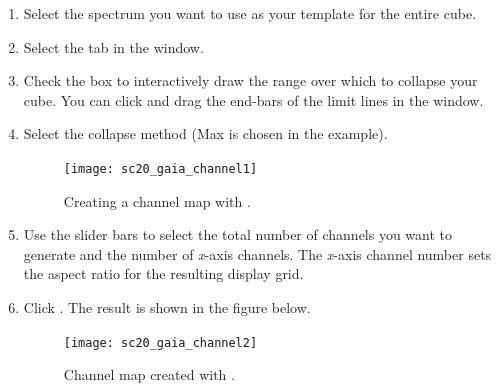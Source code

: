 \documentclass[11pt,oneside,chapters]{starlink}
\begin{document}
\begin{enumerate}[label=(\textbf{\arabic*})]
\item  Select the spectrum you want to use as your template for the entire cube.

\item Select the  tab in the  window.

\item Check the  box to interactively
draw the range over which to collapse your cube. You can click and
drag the end-bars of the limit lines in the 
window.

\item Select the collapse method (Max is chosen in the example).

\begin{figure}[h!]
\begin{center}
\texttt{[image: sc20\_gaia\_channel1]}
\caption[Creating a channel map with \gaia.]{\label{fig:gaia_chan1}
  Creating a channel map with \gaia.}
\end{center}
\end{figure}

\item Use the slider bars to select the total number of channels you
want to generate and the number of \textit{x}-axis channels. The
\textit{x}-axis channel number sets the aspect ratio for the resulting
display grid.

\item Click . The result is shown in the figure below.

\begin{figure}[t!]
\begin{center}
\texttt{[image: sc20\_gaia\_channel2]}
\caption[Channel map created with \gaia.]{\label{fig:gaia_chan2}
  Channel map created with \gaia.}
\end{center}
\end{figure}
\end{enumerate}
\end{document}
